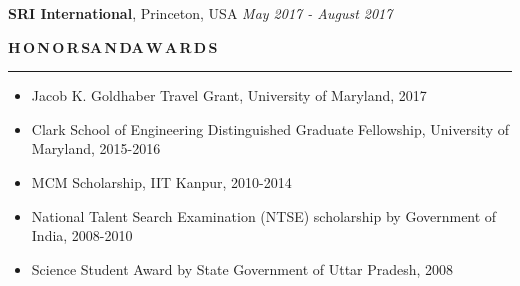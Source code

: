 \documentclass[11pt, a4paper]{article}
\begin{document}
\vspace{2pt}

\textbf{SRI International}, Princeton, USA \hfill \textit{May 2017 - August 2017} 

%

%
	
%

\vspace{4pt}

\textbf{H\,O\,N\,O\,R\,S{\hspace{0.6em}}A\,N\,D{\hspace{0.6em}}A\,W\,A\,R\,D\,S}
\vspace{5pt}
\hrule
\vspace{-3pt}
\begin{itemize}[leftmargin=*] \itemsep1pt \parskip0pt 
\item Jacob K. Goldhaber Travel Grant, University of Maryland, 2017
\item Clark School of Engineering Distinguished Graduate Fellowship, University of Maryland, 2015-2016
\item MCM Scholarship, IIT Kanpur, 2010-2014
\item National Talent Search Examination (NTSE) scholarship by Government of India, 2008-2010
\item Science Student Award by State Government of Uttar Pradesh, 2008
\end{itemize}
\end{document}
